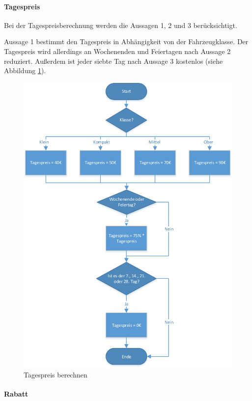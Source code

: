 \paragraph{Tagespreis}

Bei der Tagespreisberechnung werden die Aussagen 1, 2 und 3 berücksichtigt.

Aussage 1 bestimmt den Tagespreis in Abhängigkeit von der Fahrzeugklasse.
Der Tagespreis wird allerdings an Wochenenden und Feiertagen nach Aussage 2
reduziert. Außerdem ist jeder siebte Tag nach Aussage 3 kostenlos (siehe Abbildung
\ref{fig:Tagespreis_berechnen}).

\begin{figure}[p]
	\centering
	\includegraphics[width=0.9\linewidth]{Bilder/Tagespreis_berechnen}
	\caption{Tagespreis berechnen}
	\label{fig:Tagespreis_berechnen}
\end{figure}

\paragraph{Rabatt}

